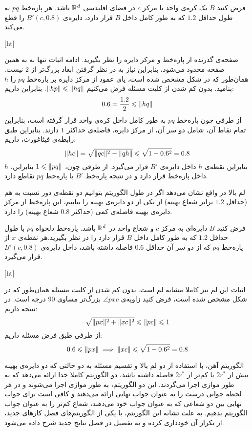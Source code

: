 فرض کنید $B$ یک کره‌ی واحد با مرکز $c$ در فضای اقلیدسی $\mathbb{R}^d$ باشد. هر پاره‌خط $pq$ به طول حداقل $1.2$ که به طور کامل داخل $B$ قرار دارد، دایره‌ی $B'(c, 0.8)$ را قطع می‌کند.

[ht]


صفحه‌ی گذرنده از پاره‌خط و مرکز دایره را نظر بگیرید. ادامه اثبات تنها به به همین صفحه محدود می‌شود، بنابراین نیاز به در نظر گرفتن ابعاد بزرگ‌تر از $2$ نیست. همان‌طور که در شکل  مشخص شده است، پای عمود از مرکز دایره بر پاره‌خط $pq$ را $h$ بنامید. بدون کم شدن از کلیت مسئله فرض می‌کنیم $\|{hp}\| \leqslant \|{hq}\|$. بنابراین داریم:
$$0.6 = \frac{1.2}{2} \leqslant \|{hq}\|$$
از‌ طرفی چون پاره‌خط $pq$ به طور کامل داخل کره‌ی واحد قرار گرفته است، بنابراین تمام نقاط آن، شامل دو سر آن، از مرکز دایره، فاصله‌ی حداکثر ۱ دارند. بنابراین طبق رابطه‌ی فیثاغورث، داریم:
$$\|{hc}\| = \sqrt{\|{qc}\|^2 - \|{qh}\|} \leqslant \sqrt{1 - 0.6^2} = 0.8$$
بنابراین نقطه‌ی $h$ داخل دایره‌ی $B'$ قرار می‌گیرد. از طرفی چون، $1 \leqslant \|{pq}\|$ بنابراین، $h$ داخل پاره‌خط قرار دارد و در نتیجه پاره‌خط $B'$ با پاره‌خط $pq$ تقاطع دارد. 


لم بالا در واقع نشان می‌دهد اگر در طول الگوریتم بتوانیم دو نقطه‌ی دور نسبت به هم (حداقل $1.2$ برابر شعاع بهینه) از یکی از دو دایره‌ی بهینه را بیابیم، این پاره‌خط از مرکز دایره‌ی بهینه فاصله‌ی کمی‌ (حداکثر $0.8$ شعاع بهینه) را دارد.

فرض کنید $B$ دایره‌ای به مرکز $c$ و شعاع واحد در $\mathbb{R}^d$ باشد. پاره‌خط دلخواه $pq$ با طول حداقل $1.2$ که به طور کامل داخل $B$ قرار دارد را در نظر بگیرید.هر نقطه‌ی $x$ از پاره‌خط $pq$ که از دو سر آن حداقل $0.6$ فاصله داشته باشد، داخل دایره‌ی $B'(c, 0.8)$ قرار می‌گیرد.


[ht]


اثبات این لم نیز کاملا مشابه لم  است. بدون کم شدن از کلیت  مسئله همان‌طور که در شکل  مشخص شده است، فرض کنید زاویه‌ی $\angle{pxc}$ بزرگ‌تر مساوی $90$ درجه است. در نتیجه داریم:
$$\sqrt{\|{px}\|^2 + \|{xc}\|^2} \leqslant \|{pc}\| \leqslant 1$$
از طرفی طبق فرض مسئله داریم:
$$0.6 \leqslant \|{px}\| \implies \|{xc}\| \leqslant \sqrt{1 - 0.6^2} = 0.8$$


الگوریتم آهن، با استفاده از دو لم بالا و تقسیم مسئله به دو حالتی که دو دایره‌ی بهینه بیش از $2r^*$ یا کم‌تر از $2r^*$ فاصله داشته باشد، دو الگوریتم کاملا جدا ارائه می‌دهد که به طور موازی اجرا می‌گردند. این دو الگوریتم، به طور موازی اجرا می‌شوند و در هر لحظه جوابی درست را به عنوان جواب نهایی ارائه می‌دهند و کافی است برای جواب نهایی بین دو شعاعی که به عنوان جواب خود می‌دهند، شعاع کم‌تر را به عنوان جواب الگوریتم بدهیم. به علت تشابه این الگوریتم، با یکی از الگوریتم‌های فصل کار‌های جدید، از تکرار آن خودداری کرده و به تفصیل در فصل نتایج جدید شرح داده می‌شود.

